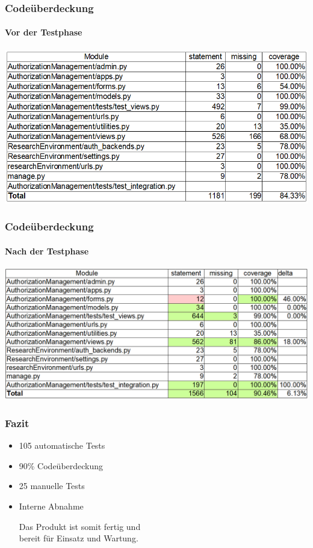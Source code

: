\documentclass{beamer}
\begin{document}

\begin{frame}
\frametitle{Codeüberdeckung}
\framesubtitle{Vor der Testphase}
\begin{center}
\includegraphics[width=\linewidth,height=\textheight,keepaspectratio]{res/coverage_before.png}
\end{center}
\end{frame}


\begin{frame}
\frametitle{Codeüberdeckung}
\framesubtitle{Nach der Testphase}
\begin{center}
\includegraphics[width=\linewidth,height=\textheight,keepaspectratio]{res/coverage_after.png}
\end{center}
\end{frame}

\begin{frame}
\frametitle{Fazit}
	\begin{itemize}
		\item<1-4> 105 automatische Tests
		\item<2-4> 90\% Codeüberdeckung
		\item<3-4> 25 manuelle Tests
		\item<4> Interne Abnahme\\
	
	\begin{center}
	Das Produkt ist somit fertig und \\bereit für Einsatz und Wartung.
	\end{center}
	
	\end{itemize}
\end{frame}
\end{document}
